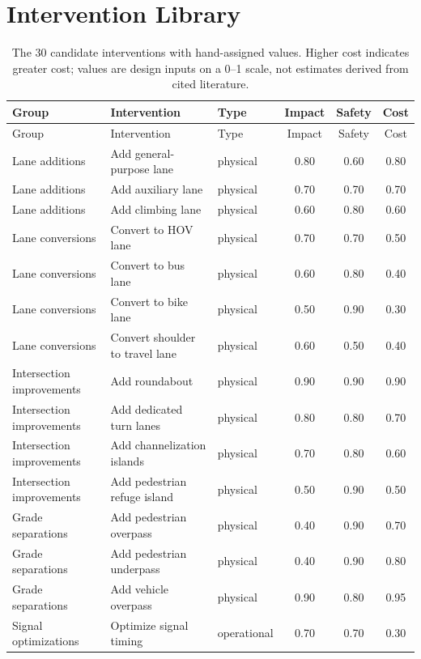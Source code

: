 \documentclass[11pt]{article}
\begin{document}
\section{Intervention Library}
\setcounter{table}{0}
\begin{longtable}{P{0.19\textwidth} P{0.31\textwidth} P{0.13\textwidth} c c c}
\caption{The 30 candidate interventions with hand-assigned values. Higher cost indicates greater cost; values are design inputs on a 0--1 scale, not estimates derived from cited literature.}\label{tab:library}\\
\toprule Group & Intervention & Type & Impact & Safety & Cost \\
\midrule
\endfirsthead
\toprule Group & Intervention & Type & Impact & Safety & Cost \\
\midrule
\endhead
Lane additions & Add general-purpose lane & physical & 0.80 & 0.60 & 0.80 \\
Lane additions & Add auxiliary lane & physical & 0.70 & 0.70 & 0.70 \\
Lane additions & Add climbing lane & physical & 0.60 & 0.80 & 0.60 \\
Lane conversions & Convert to HOV lane & physical & 0.70 & 0.70 & 0.50 \\
Lane conversions & Convert to bus lane & physical & 0.60 & 0.80 & 0.40 \\
Lane conversions & Convert to bike lane & physical & 0.50 & 0.90 & 0.30 \\
Lane conversions & Convert shoulder to travel lane & physical & 0.60 & 0.50 & 0.40 \\
Intersection improvements & Add roundabout & physical & 0.90 & 0.90 & 0.90 \\
Intersection improvements & Add dedicated turn lanes & physical & 0.80 & 0.80 & 0.70 \\
Intersection improvements & Add channelization islands & physical & 0.70 & 0.80 & 0.60 \\
Intersection improvements & Add pedestrian refuge island & physical & 0.50 & 0.90 & 0.50 \\
Grade separations & Add pedestrian overpass & physical & 0.40 & 0.90 & 0.70 \\
Grade separations & Add pedestrian underpass & physical & 0.40 & 0.90 & 0.80 \\
Grade separations & Add vehicle overpass & physical & 0.90 & 0.80 & 0.95 \\
Signal optimizations & Optimize signal timing & operational & 0.70 & 0.70 & 0.30 \\

\end{longtable}
\end{document}
